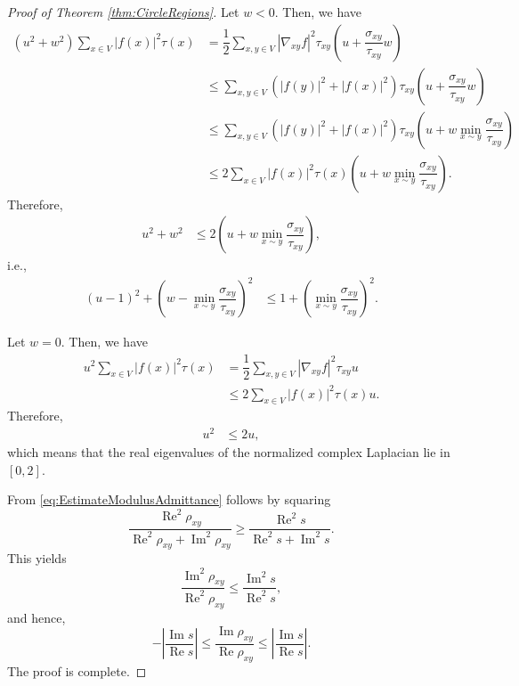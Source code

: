 \documentclass[10pt,a4paper]{amsart}
\renewcommand{\Im}{\operatorname{Im}}%
\renewcommand{\Re}{\operatorname{Re}}%
\begin{document}
\begin{proof}[Proof of Theorem \ref{thm:CircleRegions}]
Let $w<0$.
Then, we have
\begin{align*}
(u^2+w^2)\sum_{x\in V}|f(x)|^2\tau(x)&=\dfrac{1}{2}\sum_{x,y\in V}|\nabla_{xy}f|^2\tau_{xy}(u+\dfrac{\sigma_{xy}}{\tau_{xy}}w)\\
&\le \sum_{x,y\in V}(|f(y)|^2+|f(x)|^2)\tau_{xy}(u+\dfrac{\sigma_{xy}}{\tau_{xy}}w) \\
&\le \sum_{x,y\in V}(|f(y)|^2+|f(x)|^2)\tau_{xy}(u+w\min_{x\sim y}\dfrac{\sigma_{xy}}{\tau_{xy}}) \\
&\le 2\sum_{x\in V}|f(x)|^2\tau(x)(u+w\min_{x\sim y}\dfrac{\sigma_{xy}}{\tau_{xy}}) .
\end{align*}
Therefore,
\begin{align*}
u^2+w^2&\le 2(u+w\min_{x\sim y}\dfrac{\sigma_{xy}}{\tau_{xy}}) ,
\end{align*}
i.e.,
\begin{align*}
(u-1)^2+\left(w-\min_{x\sim y}\dfrac{\sigma_{xy}}{\tau_{xy}}\right)^2&\le 1+\left(\min_{x\sim y}\dfrac{\sigma_{xy}}{\tau_{xy}}\right)^2.
\end{align*}

Let $w=0$.
Then, we have
\begin{align*}
u^2\sum_{x\in V}|f(x)|^2\tau(x)&=\dfrac{1}{2}\sum_{x,y\in V}|\nabla_{xy}f|^2\tau_{xy}u\\
&\le 2\sum_{x\in V}|f(x)|^2\tau(x)u .
\end{align*}
Therefore,
\begin{align*}
u^2&\le 2u,
\end{align*}
which means that the real eigenvalues of the normalized complex Laplacian lie in $[0,2]$.

From \eqref{eq:EstimateModulusAdmittance} follows by squaring
\begin{equation*}
\dfrac{\Re^2 \rho_{xy}}{\Re^2 \rho_{xy}+\Im^2 \rho_{xy}}\ge \dfrac{\Re^2 s}{\Re^2 s+\Im^2 s}.
\end{equation*}
This yields
\begin{equation*}
\dfrac{\Im^2 \rho_{xy}}{\Re^2 \rho_{xy}}\le \dfrac{\Im^2 s}{\Re^2 s},
\end{equation*}
and hence,
\begin{equation*}
-\left| \dfrac{\Im s}{\Re s}\right|\le \dfrac{\Im \rho_{xy}}{\Re\rho_{xy}}\le\left| \dfrac{\Im s}{\Re s}\right|.
\end{equation*}
The proof is complete.
\end{proof}
\end{document}
